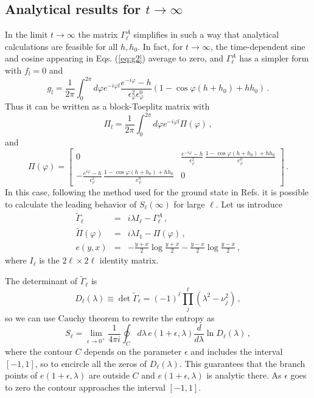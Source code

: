 \documentclass[12pt,preprint,tighten,eqsecnum,aps,floats,psfig,epsfig,amsmath,onecolumn]{revtex4-1}
\def\be{\begin{equation}}
\def\ee{\end{equation}}
\def\bea{\begin{eqnarray}}
\def\eea{\end{eqnarray}}
\def\e{\epsilon}
\def\p{\varphi}
\begin{document}
\subsection{Analytical results for $t\rightarrow\infty$}

In the limit $t\rightarrow\infty$ the matrix $\Gamma_\ell^A$ simplifies 
in such a way that analytical calculations are feasible for all $h,h_0$.
In fact, for $t\rightarrow \infty$, the time-dependent sine and cosine 
appearing in Eqs. (\ref{eq:g2}) average to zero, and $\Gamma_\ell^A$ has 
a simpler form with $f_l=0$ and 
\be
g_l=\frac{1}{2\pi} \int_0^{2\pi} d\p e^{-i\p l} 
\frac{e^{-i \p}-h}{\e_\p^2 \e_\p^0}(1-\cos\p(h+h_0)+h h_0)\,.
\ee
Thus it can be written as a block-Toeplitz matrix with
\be 
\Pi_l=\frac{1}{2\pi}\int_0^{2\pi} d\p e^{-i\varphi l} \Pi(\p)\,,
\ee
and
\be
\Pi(\p)=
 \left[\begin{array}{cc}
0 & \displaystyle{\frac{e^{-i\p}-h}{\e_\p^2}\,
\frac{1-\cos\p(h+h_0)+h h_0}{e^0_\p}} \\
- \displaystyle{\frac{e^{i\p}-h}{\e_\p^2}\,
\frac{1-\cos\p(h+h_0)+h h_0}{e^0_\p}} & 0
\end{array}
\right]\,.
\ee
In this case, following the method used for the ground state in 
Refs. \cite{jk-04,ijk-04} it is possible to calculate the leading behavior
of $S_\ell(\infty)$ for large $\ell$. 
Let us introduce \cite{jk-04,ijk-04}
\bea
\tilde{\Gamma}_\ell&=& i \lambda I_\ell -\Gamma^A_\ell\,,\\
\tilde\Pi(\p)&=&i\lambda I_1-\Pi(\p)\,,\\
e(y,x)&=&-\frac{y+x}{2} \log\frac{y+x}{2}-\frac{y-x}{2} \log\frac{y-x}{2}\,,
\eea
where $I_\ell$ is the $2\ell\times2\ell$ identity matrix.

The determinant of $\tilde{\Gamma}_\ell$ is
\be
D_\ell(\lambda)\equiv\det\tilde{\Gamma}_\ell=(-1)^\ell \prod_j^\ell (\lambda^2-\nu_j^2)\,,
\ee
so we can use Cauchy theorem to rewrite the entropy as \cite{ijk-04}
\be
S_\ell=\lim_{\e\rightarrow0^+}\frac{1}{4\pi i}
\oint_{C}d\lambda \,e(1+\e,\lambda)\frac{d}{d\lambda}\ln D_\ell(\lambda)\,,
\label{Kformula}
\ee
where the contour $C$ depends on the parameter $\e$ and includes the 
interval $[-1,1]$, so to encircle all the zeros of $D_\ell(\lambda)$.
This guarantees that the branch points of $e(1+\e,\lambda)$ are 
outside $C$ and $e(1+\e,\lambda)$ is analytic there.
As $\e$ goes to zero the contour approaches the interval $[-1,1]$.
\end{document}
